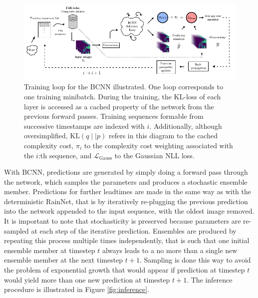 \begin{figure}[ht]
	\begin{center}
		\includegraphics[scale=1]{images/training_diagram/training_diagram.pdf}
		\caption{Training loop for the BCNN illustrated. One loop corresponds to one training minibatch. During the training, the KL-loss of each layer is accessed as a cached property of the network from the previous forward passes. Training sequences formable from successive timestamps are indexed with $i$. Additionally, although oversimplified, $\text{KL}(q \mid \mid p)$ refers in this diagram to the cached complexity cost, $\pi_i$ to the complexity cost weighting associated with the $i$:th sequence, and $\mathcal{L}_{\text{Gauss}}$ to the Gaussian NLL loss.}
		\label{fig:training}
	\end{center}
\end{figure}

With BCNN, predictions are generated by simply doing a forward pass through the network, which samples the parameters and produces a stochastic ensemble member. Predictions for further leadtimes are made in the same way as with the deterministic RainNet, that is by iteratively re-plugging the previous prediction into the network appended to the input sequence, with the oldest image removed. It is important to note that stochasticity is preserved because parameters are re-sampled at each step of the iterative prediction. Ensembles are produced by repeating this process multiple times independently, that is such that one initial ensemble member at timestep $t$ always leads to a no more than a single new ensemble member at the next timestep $t+1$. Sampling is done this way to avoid the problem of exponential growth that would appear if prediction at timestep $t$ would yield more than one new prediction at timestep $t+1$. The inference procedure is illustrated in Figure \ref{fig:inference}.

